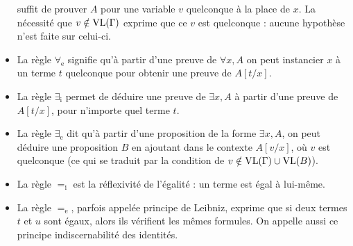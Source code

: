 \begin{itemize}
  suffit de prouver $A$ pour une variable $v$ quelconque à la place de $x$. La
  nécessité que $v\notin\operatorname{VL}(\Gamma)$ exprime que ce $v$ est quelconque : aucune
  hypothèse n'est faite sur celui-ci.
\item La règle $\forall_\mathrm e$ signifie qu'à partir d'une preuve de
  $\forall x, A$ on peut instancier $x$ à un terme $t$ quelconque pour obtenir
  une preuve de $A[t/x]$.
\item La règle $\exists_\mathrm i$ permet de déduire une preuve de $\exists x,A$
  à partir d'une preuve de $A[t/x]$, pour n'importe quel terme $t$.
\item La règle $\exists_\mathrm e$ dit qu'à partir d'une proposition de la forme
  $\exists x, A$, on peut déduire une proposition $B$ en ajoutant dans le
  contexte $A[v/x]$, où $v$ est quelconque (ce qui se traduit par la condition
  de $v\notin\operatorname{VL}(\Gamma)\cup\operatorname{VL}(B)$).
\item La règle $=_\mathrm i$ est la réflexivité de l'égalité : un terme est
  égal à lui-même.
\item La règle $=_\mathrm e$, parfois appelée principe de Leibniz, exprime que
  si deux termes $t$ et $u$ sont égaux, alors ils vérifient les mêmes formules.
  On appelle aussi ce principe \og indiscernabilité des identités\fg{}.
\end{itemize}
